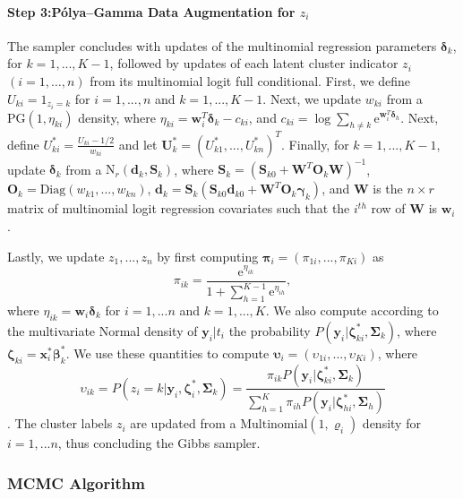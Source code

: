 \documentclass[useAMS,referee]{biom}
\begin{document}
\paragraph{\textbf{Step 3:}P\'olya--Gamma Data Augmentation for $z_i$} The sampler concludes with updates of the multinomial regression parameters $\boldsymbol\delta_k$, for $k = 1,...,K-1$, followed by updates of each latent cluster indicator $z_i$ $(i=1,\ldots,n)$ from its multinomial logit full conditional. First, we define $U_{ki} = {1}_{z_i = k}$ for $i = 1,...,n$ and $k = 1,...,K-1$. Next, we update ${w}_{ki}$ from a $\text{PG}(1,\eta_{ki})$ density, where $\eta_{ki} = \mathbf{w}_i^T \boldsymbol\delta_k - {c}_{ki}$, and ${c}_{ki} = \log \sum_{h \ne k} \text{e}^{\mathbf{w}_i^T \boldsymbol\delta_{h}}$. Next, define $U^*_{ki} = \frac{U_{ki} - 1/2}{{w}_{ki}}$ and let $\mathbf{U}^*_k = (U^*_{k1},...,U^*_{kn})^T$. Finally, for $k = 1,...,K-1$, update $\boldsymbol\delta_k$ from a $\text{N}_r(\mathbf{d}_k,\mathbf{S}_k)$, where $\mathbf{S}_k = (\mathbf{S}_{k0} + \mathbf{W}^T \mathbf{O}_k \mathbf{W})^{-1}$, $\mathbf{O}_k = \text{Diag}({w}_{k1},...,{w}_{kn})$,  $\mathbf{d}_k = \mathbf{S}_k (\mathbf{S}_{k0}\mathbf{d}_{k0} + \mathbf{W}^T \mathbf{O}_k \boldsymbol\gamma_k)$, and $\mathbf{W}$ is the $n \times r$ matrix of multinomial logit regression covariates such that the $i^{th}$ row of $\mathbf{W}$ is $\mathbf{w}_i$.

Lastly, we update $z_1,...,z_n$ by first computing $\boldsymbol\pi_i = (\pi_{1i},...,\pi_{Ki})$ as
$$\pi_{ik} = \frac{\text{e}^{\eta_{ik}}}{1 + \sum_{h=1}^{K-1} \text{e}^{\eta_{ih}}},$$ 
where $\eta_{ik} = \mathbf{w}_i\boldsymbol\delta_k$ for $i = 1,...n$ and $k = 1,...,K$. We also compute according to the multivariate Normal density of $\mathbf{y}_i|t_i$ the probability $P(\mathbf{y}_i|\boldsymbol\zeta^*_{ki},\boldsymbol\Sigma_k)$, where $\boldsymbol\zeta_{ki} = \mathbf{x}_i^*\boldsymbol\beta^*_k$. We use these quantities to compute $\boldsymbol\upsilon_{i} = (\upsilon_{1i},...,\upsilon_{Ki})$, where  
$$\upsilon_{ik} = P(z_i = k|\mathbf{y}_i,\boldsymbol\zeta^*_i,\boldsymbol\Sigma_k) = \frac{\pi_{ik}P(\mathbf{y}_i|\boldsymbol\zeta^*_{ki},\boldsymbol\Sigma_k)}{\sum_{h = 1}^{K} \pi_{ih}P(\mathbf{y}_i|\boldsymbol\zeta^*_{hi},\boldsymbol\Sigma_h)}$$.
The cluster labels $z_i$ are updated from a $\text{Multinomial}(1,\boldsymbol\varrho_i)$ density for $i = 1,...n$, thus concluding the Gibbs sampler.


\subsubsection{MCMC Algorithm}
\end{document}
